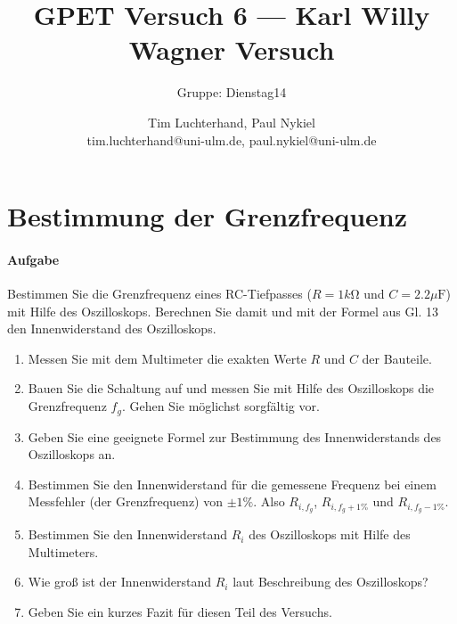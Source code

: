 \documentclass[10pt]{scrreprt}
\author{Tim Luchterhand, Paul Nykiel \protect\\ tim.luchterhand@uni-ulm.de, paul.nykiel@uni-ulm.de}
\title{GPET Versuch 6 --- Karl Willy Wagner Versuch}
\subtitle{Gruppe: Dienstag14}
\begin{document}
    \maketitle
    \section{Bestimmung der Grenzfrequenz}
    \paragraph{Aufgabe}
    Bestimmen Sie die Grenzfrequenz eines RC-Tiefpasses ($R = 1\si{k\ohm}$ und $C = 2.2\si{\mu\farad}$) mit
    Hilfe des Oszilloskops. Berechnen Sie damit und mit der Formel aus Gl. 13 den Innenwiderstand des Oszilloskops.
    \begin{enumerate}
        \item Messen Sie mit dem Multimeter die exakten Werte $R$ und $C$ der Bauteile.
        \item Bauen Sie die Schaltung auf und messen Sie mit Hilfe des Oszilloskops die Grenzfrequenz
                $f_g$. Gehen Sie möglichst sorgfältig vor.
        \item Geben Sie eine geeignete Formel zur Bestimmung des Innenwiderstands des Oszilloskops an.
        \item Bestimmen Sie den Innenwiderstand für die gemessene Frequenz bei einem Messfehler
                (der Grenzfrequenz) von $\pm1\%$. Also $R_{i,f_g}$, $R_{i,f_g+1\%}$ und $R_{i,f_g-1\%}$.
        \item Bestimmen Sie den Innenwiderstand $R_i$ des Oszilloskops mit Hilfe des Multimeters.
        \item Wie groß ist der Innenwiderstand $R_i$ laut Beschreibung des Oszilloskops?
        \item Geben Sie ein kurzes Fazit für diesen Teil des Versuchs.
    \end{enumerate}
\end{document}
